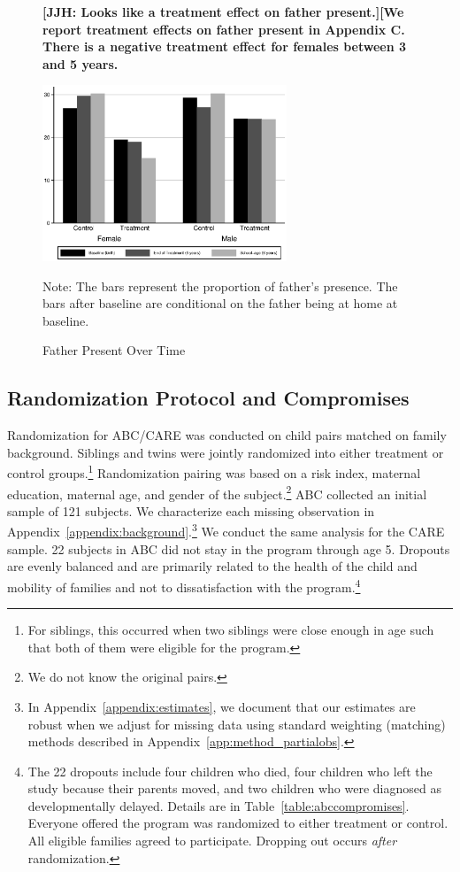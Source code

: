 \begin{figure}[H]
\textbf{[JJH: Looks like a treatment effect on father present.][We report treatment effects on father present in Appendix C. There is a negative treatment effect for females between 3 and 5 years.}
\begin{center}
\caption{Father Present Over Time}
\label{fig:family-over-time}
		\label{fig:fhome}
			\includegraphics[width=0.65\textwidth]{output/family-fhome}
\end{center}
\footnotesize \justify
Note: The bars represent the proportion of father's presence. The bars after baseline are conditional on the father being at home at baseline.
\end{figure}

\subsection{Randomization Protocol and Compromises} \label{section:randomization}

Randomization for ABC/CARE was conducted on child pairs matched on family background. Siblings and twins were jointly randomized into either treatment or control groups.\footnote{For siblings, this occurred when two siblings were close enough in age such that both of them were eligible for the program.} Randomization pairing was based on a risk index, maternal education, maternal age, and gender of the subject.\footnote{We do not know the original pairs.} ABC collected an initial sample of 121 subjects. We characterize each missing observation in Appendix~\ref{appendix:background}.\footnote{In Appendix~\ref{appendix:estimates}, we document that our estimates are robust when we adjust for missing data using standard weighting (matching) methods described in Appendix~\ref{app:method_partialobs}.} We conduct the same analysis for the CARE sample. 22 subjects in ABC did not stay in the program through age 5. Dropouts are evenly balanced and are primarily related to the health of the child and mobility of families and not to dissatisfaction with the program.\footnote{The 22 dropouts include four children who died, four children who left the study because their parents moved, and two children who were diagnosed as developmentally delayed. Details are in Table~\ref{table:abccompromises}. Everyone offered the program was randomized to either treatment or control. All eligible families agreed to participate. Dropping out occurs \emph{after} randomization.}

